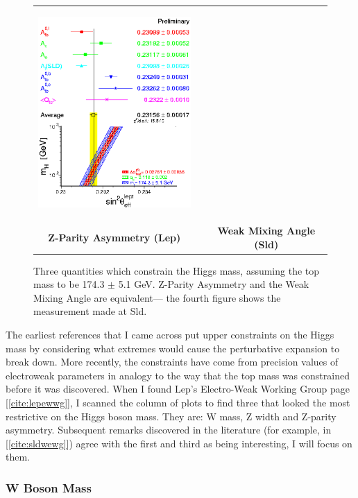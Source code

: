 \documentclass[12pt]{article}
\def\lep{{\sc Lep}}
\def\sld{{\sc Sld}}
\begin{document}
\begin{figure}
\begin{center}
\begin{tabular}{c p{0.5cm} c}
      \includegraphics[height=8cm]{sld_al.eps} \\
      {\bf Z-Parity Asymmetry (\lep)} & & {\bf Weak Mixing Angle (\sld)} \\
    \end{tabular}
  \end{center}

  \caption{Three quantities which constrain the Higgs mass, assuming
  the top mass to be 174.3 $\pm$ 5.1 GeV. Z-Parity Asymmetry and the
  Weak Mixing Angle are equivalent--- the fourth figure shows the
  measurement made at \sld.}

\end{figure}

The earliest references that I came across put upper constraints on
the Higgs mass by considering what extremes would cause the
perturbative expansion to break down. More recently, the constraints
have come from precision values of electroweak parameters in analogy
to the way that the top mass was constrained before it was discovered.
When I found \lep's Electro-Weak Working Group page
[\ref{cite:lepewwg}], I scanned the column of plots to find three that
looked the most restrictive on the Higgs boson mass. They are: W mass,
Z width and Z-parity asymmetry. Subsequent remarks discovered in the
literature (for example, in [\ref{cite:sldwewg}]) agree with the first
and third as being interesting, I will focus on them.

\subsubsection{W Boson Mass}
\end{document}
